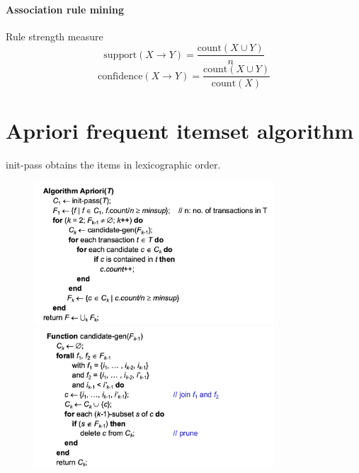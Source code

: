 \documentclass[10pt,oneside,a4paper]{article}
\begin{document}

\paragraph{Association rule mining}
Rule strength measure
\[
    \text{support}(X \rightarrow Y) = \frac{\text{count}(X \cup Y)}{n}
\]
\[
    \text{confidence}(X \rightarrow Y) = \frac{\text{count}(X \cup Y)}{\text{count}(X)}
\]

\section{Apriori frequent itemset algorithm}
init-pass obtains the items in lexicographic order.
\begin{figure}[H]
    \centering
    \begin{minipage}[t]{0.5\textwidth}
        \centering
        \includegraphics[width=0.8\textwidth]{Images/Apriori.png}
    \end{minipage}%
    \hfill
    \begin{minipage}[t]{0.5\textwidth}
        \centering
        \includegraphics[width=0.8\textwidth]{Images/Candidate_gen_apriori.png}
    \end{minipage}%
\end{figure}
\end{document}
